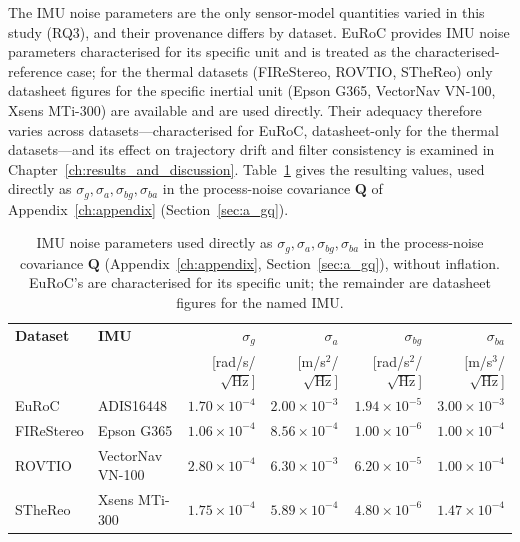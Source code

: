 The IMU noise parameters are the only sensor-model quantities varied in this study (RQ3), and their provenance differs by dataset. EuRoC provides IMU noise parameters characterised for its specific unit and is treated as the characterised-reference case; for the thermal datasets (FIReStereo, ROVTIO, STheReo) only datasheet figures for the specific inertial unit (Epson G365, VectorNav VN-100, Xsens MTi-300) are available and are used directly. Their adequacy therefore varies across datasets---characterised for EuRoC, datasheet-only for the thermal datasets---and its effect on trajectory drift and filter consistency is examined in Chapter~\ref{ch:results_and_discussion}. Table~\ref{tab:d_imu_noise} gives the resulting values, used directly as $\sigma_g, \sigma_a, \sigma_{bg}, \sigma_{ba}$ in the process-noise covariance $\mathbf{Q}$ of Appendix~\ref{ch:appendix} (Section~\ref{sec:a_gq}).

\begin{table}[htbp]
\centering
\footnotesize
\caption{IMU noise parameters used directly as $\sigma_g, \sigma_a, \sigma_{bg}, \sigma_{ba}$ in the process-noise covariance $\mathbf{Q}$ (Appendix~\ref{ch:appendix}, Section~\ref{sec:a_gq}), without inflation. EuRoC's are characterised for its specific unit; the remainder are datasheet figures for the named IMU.}
\label{tab:d_imu_noise}
\begin{tabular}{ll rrrr}
\toprule
\textbf{Dataset} & \textbf{IMU} & $\sigma_g$ & $\sigma_a$ & $\sigma_{bg}$ & $\sigma_{ba}$ \\
 & & \scriptsize[rad/s/$\sqrt{\text{Hz}}$] & \scriptsize[m/s$^2$/$\sqrt{\text{Hz}}$] & \scriptsize[rad/s$^2$/$\sqrt{\text{Hz}}$] & \scriptsize[m/s$^3$/$\sqrt{\text{Hz}}$] \\
\midrule
EuRoC       & ADIS16448     & $1.70\times10^{-4}$ & $2.00\times10^{-3}$ & $1.94\times10^{-5}$ & $3.00\times10^{-3}$ \\
FIReStereo  & Epson G365    & $1.06\times10^{-4}$ & $8.56\times10^{-4}$ & $1.00\times10^{-6}$ & $1.00\times10^{-4}$ \\
ROVTIO      & VectorNav VN-100 & $2.80\times10^{-4}$ & $6.30\times10^{-3}$ & $6.20\times10^{-5}$ & $1.00\times10^{-4}$ \\
STheReo     & Xsens MTi-300 & $1.75\times10^{-4}$ & $5.89\times10^{-4}$ & $4.80\times10^{-6}$ & $1.47\times10^{-4}$ \\
\bottomrule
\end{tabular}
\end{table}